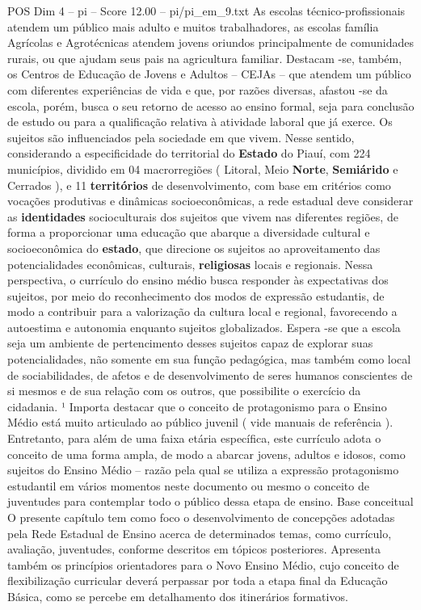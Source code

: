 \begin{textsample}{POS Dim 4 – pi – Score 12.00 – pi/pi\_em\_9.txt}
As escolas técnico-profissionais atendem um público mais adulto e muitos trabalhadores, as escolas família Agrícolas e Agrotécnicas atendem jovens oriundos principalmente de comunidades rurais, ou que ajudam seus pais na agricultura familiar.
Destacam -se, também, os Centros de Educação de Jovens e Adultos – CEJAs – que atendem um público com diferentes experiências de vida e que, por razões diversas, afastou -se da escola, porém, busca o seu retorno de acesso ao ensino formal, seja para conclusão de estudo ou para a qualificação relativa à atividade laboral que já exerce.
Os sujeitos são influenciados pela sociedade em que vivem.
Nesse sentido, considerando a especificidade do territorial do \textbf{Estado} do Piauí, com 224 municípios, dividido em 04 macrorregiões ( Litoral, Meio \textbf{Norte}, \textbf{Semiárido} e Cerrados ), e 11 \textbf{territórios} de desenvolvimento, com base em critérios como vocações produtivas e dinâmicas socioeconômicas, a rede estadual deve considerar as \textbf{identidades} socioculturais dos sujeitos que vivem nas diferentes regiões, de forma a proporcionar uma educação que abarque a diversidade cultural e socioeconômica do \textbf{estado}, que direcione os sujeitos ao aproveitamento das potencialidades econômicas, culturais, \textbf{religiosas} locais e regionais.
Nessa perspectiva, o currículo do ensino médio busca responder às expectativas dos sujeitos, por meio do reconhecimento dos modos de expressão estudantis, de modo a contribuir para a valorização da cultura local e regional, favorecendo a autoestima e autonomia enquanto sujeitos globalizados.
Espera -se que a escola seja um ambiente de pertencimento desses sujeitos capaz de explorar suas potencialidades, não somente em sua função pedagógica, mas também como local de sociabilidades, de afetos e de desenvolvimento de seres humanos conscientes de si mesmos e de sua relação com os outros, que possibilite o exercício da cidadania. ¹ Importa destacar que o conceito de protagonismo para o Ensino Médio está muito articulado ao público juvenil ( vide manuais de referência ).
Entretanto, para além de uma faixa etária específica, este currículo adota o conceito de uma forma ampla, de modo a abarcar jovens, adultos e idosos, como sujeitos do Ensino Médio – razão pela qual se utiliza a expressão protagonismo estudantil em vários momentos neste documento ou mesmo o conceito de juventudes para contemplar todo o público dessa etapa de ensino.
Base conceitual O presente capítulo tem como foco o desenvolvimento de concepções adotadas pela Rede Estadual de Ensino acerca de determinados temas, como currículo, avaliação, juventudes, conforme descritos em tópicos posteriores.
Apresenta também os princípios orientadores para o Novo Ensino Médio, cujo conceito de flexibilização curricular deverá perpassar por toda a etapa final da Educação Básica, como se percebe em detalhamento dos itinerários formativos.

\end{textsample}
